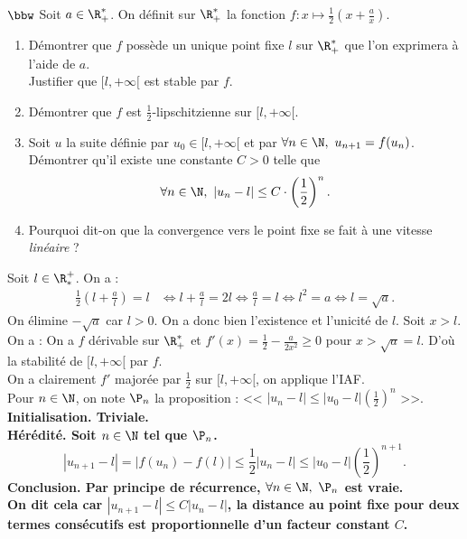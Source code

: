 \documentclass[11pt]{article}
\begin{document}
\begin{exercice}{$\bbw$}{}
    Soit $a\in\R_+^*$. On définit sur $\R_+^*$ la fonction $f:x\mapsto\frac{1}{2}\left( x+\frac{a}{x} \right)$.
    \begin{enumerate}
        \item Démontrer que $f$ possède un unique point fixe $l$ sur $\R_+^*$ que l'on exprimera à l'aide de $a$.\\
        Justifier que $[l,+\infty[$ est stable par $f$.
        \item Démontrer que $f$ est $\frac{1}{2}$-lipschitzienne sur $[l,+\infty[$.
        \item Soit $u$ la suite définie par $u_0\in[l,+\infty[$ et par $\forall n \in \N, ~ u_{n+1}=f(u_n)$.\\
        Démontrer qu'il existe une constante $C>0$ telle que
        \begin{equation*}
            \forall n \in \N, ~ |u_n-l|\leq C\cdot\left( \frac{1}{2} \right)^n.
        \end{equation*}
        \item Pourquoi dit-on que la convergence vers le point fixe se fait à une vitesse \emph{linéaire} ?
    \end{enumerate}
    \tcblower
     Soit $l\in\R^+_*$. On a :
    \begin{align*}
        \frac{1}{2}\left( l + \frac{a}{l} \right) = l &\iff l + \frac{a}{l} = 2l \iff \frac{a}{l}=l \iff l^2 = a \iff l = \sqrt{a}.
    \end{align*}
    On élimine $-\sqrt{a}$ car $l>0$. On a donc bien l'existence et l'unicité de $l$. Soit $x>l$. On a :
    On a $f$ dérivable sur $\R_+^*$ et $f'(x)=\frac{1}{2}-\frac{a}{2x^2}\geq0$ pour $x>\sqrt{a}=l$. D'où la stabilité de $[l,+\infty[$ par $f$.\\
     On a clairement $f'$ majorée par $\frac{1}{2}$ sur $[l,+\infty[$, on applique l'IAF.\\
     Pour $n\in\N$, on note $\P_n$ la proposition : << $|u_n-l|\leq |u_0-l|\left( \frac{1}{2} \right)^n$ >>.\\
    \bf{Initialisation.} Triviale.\\
    \bf{Hérédité.} Soit $n\in\N$ tel que $\P_n$.
    \begin{equation*}
        |u_{n+1}-l|=|f(u_n)-f(l)|\leq\frac{1}{2}|u_n-l|\leq|u_0-l|\left(\frac{1}{2}\right)^{n+1}.
    \end{equation*}
    \bf{Conclusion.} Par principe de récurrence, $\forall n \in \N, ~ \P_n$ est vraie.\\
     On dit cela car $|u_{n+1}-l|\leq C|u_n-l|$, la distance au point fixe pour deux termes consécutifs est proportionnelle d'un facteur constant $C$.
\end{exercice}
\end{document}
